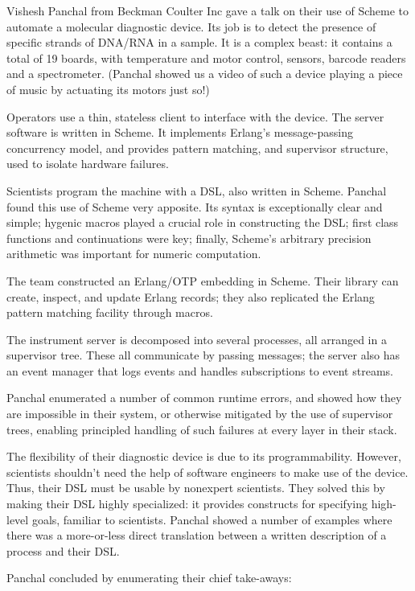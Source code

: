 \documentclass{jfp1}
\begin{document}

Vishesh Panchal from Beckman Coulter Inc gave a talk on their use of
Scheme to automate a molecular diagnostic device. Its job is to
detect the presence of specific strands of DNA/RNA in a sample. It is
a complex beast: it contains a total of 19 boards, with temperature and
motor control, sensors, barcode readers and a
spectrometer. (Panchal showed us a video of such a device playing a
piece of music by actuating its motors just so!)

Operators use a thin, stateless client to interface with the device.
The server software is written in Scheme. It implements Erlang's
message-passing concurrency model, and provides pattern matching, and
supervisor structure, used to isolate hardware failures.

Scientists program the machine with a DSL, also written in Scheme.
Panchal found this use of Scheme very apposite. Its syntax is
exceptionally clear and simple; hygenic macros played a crucial role
in constructing the DSL; first class functions and continuations were
key; finally, Scheme's arbitrary precision arithmetic was important
for numeric computation.

The team constructed an
Erlang/OTP embedding in Scheme. Their library can create, inspect, and
update Erlang records; they also replicated the Erlang pattern
matching facility through macros.

The instrument server is decomposed into several processes, all
arranged in a supervisor tree. These all communicate by passing
messages; the server also has an event manager that logs events and
handles subscriptions to event streams.

Panchal enumerated a number of common runtime errors, and showed how
they are impossible in their system, or otherwise mitigated by the
use of supervisor trees, enabling principled handling of such
failures at every layer in their stack.

The flexibility of their diagnostic device is due to its
programmability. However, scientists shouldn't need the help of
software engineers to make use of the device. Thus, their DSL must be
usable by nonexpert scientists. They solved this by making their DSL
highly specialized: it provides constructs for specifying high-level
goals, familiar to scientists. Panchal showed a number of examples
where there was a more-or-less direct translation between a written
description of a process and their DSL.

Panchal concluded by enumerating their chief take-aways:
\end{document}
